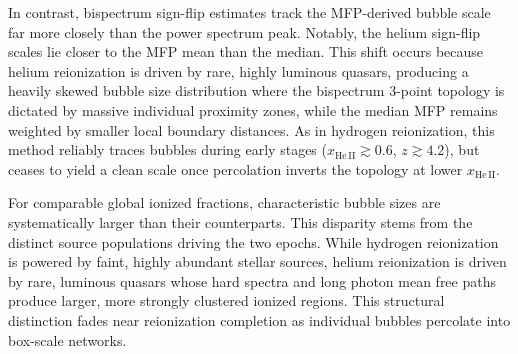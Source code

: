 \documentclass[apj,twocolumn, appendixfloats, twocolappendix, numberedappendix, tighten]{openjournal}
\begin{document}

In contrast, bispectrum sign-flip estimates track the MFP-derived bubble scale far more closely than the power spectrum peak. Notably, the helium sign-flip scales lie closer to the MFP mean than the median. This shift occurs because helium reionization is driven by rare, highly luminous quasars, producing a heavily skewed bubble size distribution where the bispectrum 3-point topology is dictated by massive individual proximity zones, while the median MFP remains weighted by smaller local boundary distances. As in hydrogen reionization, this method reliably traces  bubbles during early stages ($x_\mathrm{He\,II} \gtrsim 0.6$, $z \gtrsim 4.2$), but ceases to yield a clean scale once percolation inverts the topology at lower $x_\mathrm{He\,II}$.


For comparable global ionized fractions, characteristic  bubble sizes are systematically larger than their  counterparts. This disparity stems from the distinct source populations driving the two epochs. While hydrogen reionization is powered by faint, highly abundant stellar sources, helium reionization is driven by rare, luminous quasars whose hard spectra and long photon mean free paths produce larger, more strongly clustered ionized regions. This structural distinction fades near reionization completion as individual bubbles percolate into box-scale networks.

\end{document}
